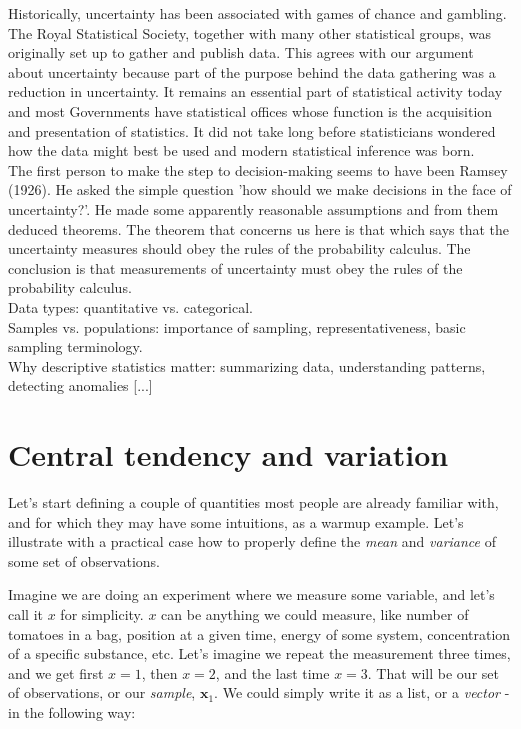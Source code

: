 \documentclass{book}
\begin{document}
\medskip

Historically, uncertainty has been associated with games of chance and gambling. The Royal Statistical Society, together with many other statistical groups, was originally set up
to gather and publish data. This agrees with our argument about uncertainty because part of the purpose behind the data gathering was a reduction in uncertainty. It remains an essential part of statistical activity today and most Governments have statistical offices whose function is the acquisition and presentation of statistics. It did not take long before statisticians wondered how the data might best be used and modern statistical inference was born.\\

The first person to make the step to decision-making seems to have been Ramsey (1926). He asked the simple question 'how should we make decisions in the face of uncertainty?'. He made some apparently reasonable assumptions and from them deduced theorems. The theorem that concerns us here is that which says that the uncertainty measures should obey the rules of the probability calculus. The conclusion is that measurements of uncertainty must obey the rules of the probability calculus.\\

Data types: quantitative vs. categorical.\\

Samples vs. populations: importance of sampling, representativeness, basic sampling terminology. \\

Why descriptive statistics matter: summarizing data, understanding patterns, detecting anomalies [...]

\section{Central tendency and variation}

Let's start defining a couple of quantities most people are already familiar with, and for which they may have some intuitions, as a warmup example. Let's illustrate with a practical case how to properly define the \textit{mean} and \textit{variance} of some set of observations.

\medskip
	
Imagine we are doing an experiment where we measure some variable, and let's call it $x$ for simplicity. $x$ can be anything we could measure, like number of tomatoes in a bag, position at a given time, energy of some system, concentration of a specific substance, etc. Let's imagine we repeat the measurement three times, and we get first $x = 1$, then $x = 2$, and the last time $x = 3$. That will be our set of observations, or our \textit{sample}, $\textbf{x}_{1}$. We could simply write it as a list, or a \textit{vector} - in the following way:
\end{document}
